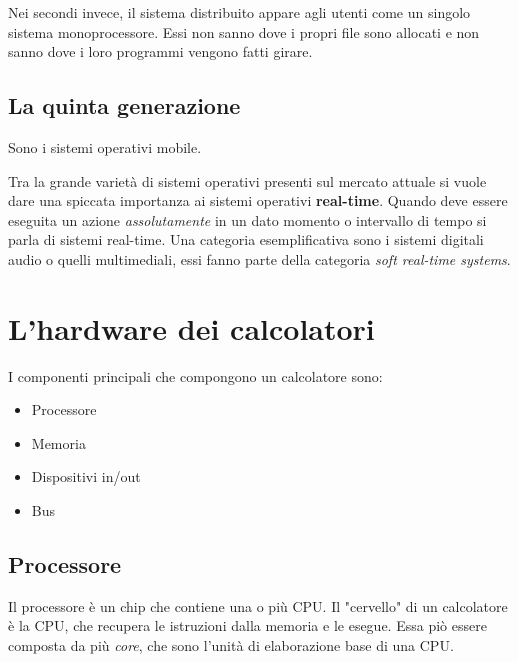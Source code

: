 Nei secondi invece, il sistema distribuito appare agli utenti come un singolo sistema monoprocessore. Essi non sanno dove i propri file sono allocati e non sanno dove i loro programmi vengono fatti girare.

\subsection{La quinta generazione}
Sono i sistemi operativi mobile.

Tra la grande varietà di sistemi operativi presenti sul mercato attuale si vuole dare una spiccata importanza ai sistemi operativi \textbf{real-time}.
Quando deve essere eseguita un azione \textit{assolutamente} in un dato momento o intervallo di tempo si parla di sistemi real-time.
Una categoria esemplificativa sono i sistemi digitali audio o quelli multimediali, essi fanno parte della categoria \textit{soft real-time systems}.


\section{L'hardware dei calcolatori}
I componenti principali che compongono un calcolatore sono:
\begin{itemize}
    \item Processore
    \item Memoria
    \item Dispositivi in/out
    \item Bus
\end{itemize}

\subsection{Processore}
Il processore è un chip che contiene una o più CPU.
Il "cervello" di un calcolatore è la CPU, che recupera le istruzioni dalla memoria e le esegue. 
Essa piò essere composta da più \textit{core}, che sono l'unità di elaborazione base di una CPU.

